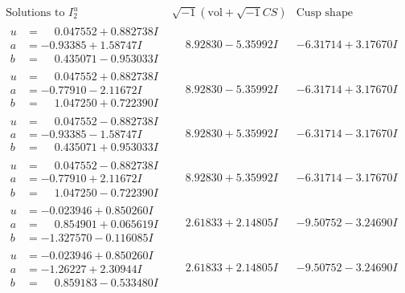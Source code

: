 \documentclass[1p]{elsarticle_modified}
\theoremstyle{definition}
\newcommand{\I}{\sqrt{-1}}
\begin{document}
$$\begin{array}{c|c|c}  
\text{Solutions to }I^u_{2}& \I (\text{vol} + \sqrt{-1}CS) & \text{Cusp shape}\\
 \hline 
\begin{aligned}
u &= \phantom{-}0.047552 + 0.882738 I \\
a &= -0.93385 + 1.58747 I \\
b &= \phantom{-}0.435071 - 0.953033 I\end{aligned}
 & \phantom{-}8.92830 - 5.35992 I & -6.31714 + 3.17670 I \\ \hline\begin{aligned}
u &= \phantom{-}0.047552 + 0.882738 I \\
a &= -0.77910 - 2.11672 I \\
b &= \phantom{-}1.047250 + 0.722390 I\end{aligned}
 & \phantom{-}8.92830 - 5.35992 I & -6.31714 + 3.17670 I \\ \hline\begin{aligned}
u &= \phantom{-}0.047552 - 0.882738 I \\
a &= -0.93385 - 1.58747 I \\
b &= \phantom{-}0.435071 + 0.953033 I\end{aligned}
 & \phantom{-}8.92830 + 5.35992 I & -6.31714 - 3.17670 I \\ \hline\begin{aligned}
u &= \phantom{-}0.047552 - 0.882738 I \\
a &= -0.77910 + 2.11672 I \\
b &= \phantom{-}1.047250 - 0.722390 I\end{aligned}
 & \phantom{-}8.92830 + 5.35992 I & -6.31714 - 3.17670 I \\ \hline\begin{aligned}
u &= -0.023946 + 0.850260 I \\
a &= \phantom{-}0.854901 + 0.065619 I \\
b &= -1.327570 - 0.116085 I\end{aligned}
 & \phantom{-}2.61833 + 2.14805 I & -9.50752 - 3.24690 I \\ \hline\begin{aligned}
u &= -0.023946 + 0.850260 I \\
a &= -1.26227 + 2.30944 I \\
b &= \phantom{-}0.859183 - 0.533480 I\end{aligned}
 & \phantom{-}2.61833 + 2.14805 I & -9.50752 - 3.24690 I \\ \hline\begin{aligned}

\end{aligned}
\end{array}$$
\end{document}
